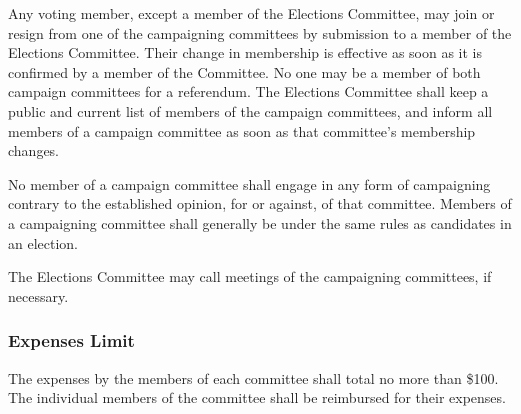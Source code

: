 Any voting member, except a member of the Elections Committee, may join or resign from one of the campaigning committees by submission to a member of the Elections Committee.
Their change in membership is effective as soon as it is confirmed by a member of the Committee.
No one may be a member of both campaign committees for a referendum.
The Elections Committee shall keep a public and current list of members of the campaign committees, and inform all members of a campaign committee as soon as that committee's membership changes.

No member of a campaign committee shall engage in any form of campaigning contrary to the established opinion, for or against, of that committee.
Members of a campaigning committee shall generally be under the same rules as candidates in an election.

The Elections Committee may call meetings of the campaigning committees, if necessary.

\subsubsection{Expenses Limit}
The expenses by the members of each committee shall total no more than \$100.
The individual members of the committee shall be reimbursed for their expenses.
